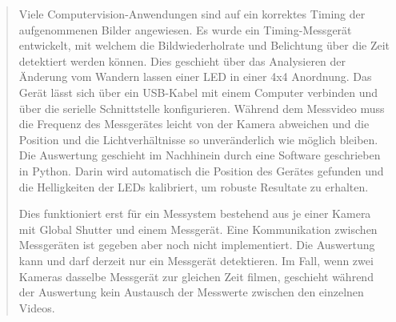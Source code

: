 \clearpage
\begin{abstract}
    Viele Computervision-Anwendungen sind auf ein korrektes Timing der aufgenommenen Bilder angewiesen.
    Es wurde ein Timing-Messgerät entwickelt, mit welchem die Bildwiederholrate und Belichtung über die Zeit detektiert werden können.
    Dies geschieht über das Analysieren der Änderung vom Wandern lassen einer LED in einer 4x4 Anordnung.
    Das Gerät lässt sich über ein USB-Kabel mit einem Computer verbinden und über die serielle Schnittstelle konfigurieren.
    Während dem Messvideo muss die Frequenz des Messgerätes leicht von der Kamera abweichen und die Position und die Lichtverhältnisse so unveränderlich wie möglich bleiben.
    Die Auswertung geschieht im Nachhinein durch eine Software geschrieben in Python.
    Darin wird automatisch die Position des Gerätes gefunden und die Helligkeiten der LEDs kalibriert, um robuste Resultate zu erhalten.

    Dies funktioniert erst für ein Messystem bestehend aus je einer Kamera mit Global Shutter und einem Messgerät.
    Eine Kommunikation zwischen Messgeräten ist gegeben aber noch nicht implementiert.
    Die Auswertung kann und darf derzeit nur ein Messgerät detektieren.
    Im Fall, wenn zwei Kameras dasselbe Messgerät zur gleichen Zeit filmen, geschieht während der Auswertung kein Austausch der Messwerte zwischen den einzelnen Videos.

\end{abstract}

